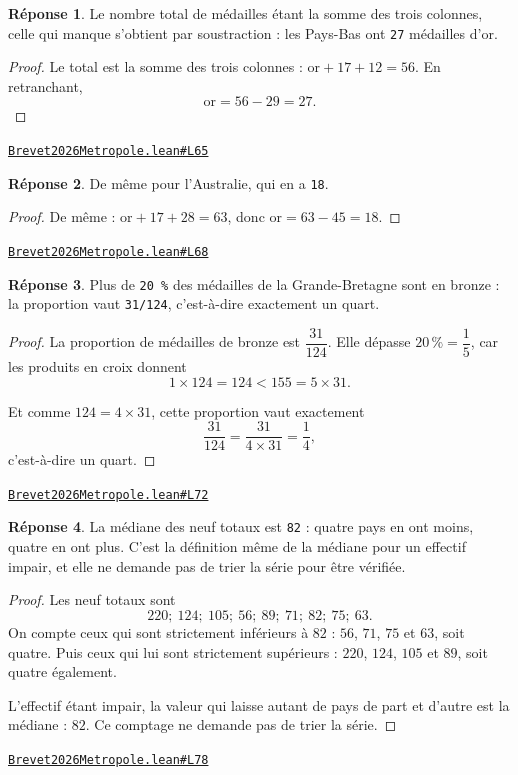 \documentclass[11pt,a4paper]{article}
\theoremstyle{definition}
\theoremstyle{plain}
\theoremstyle{definition}
\newtheorem*{reponse}{Réponse}
\newcommand{\source}[2]{\par\smallskip\noindent\hfill{\footnotesize\href{#1}{\texttt{#2}}}\par\smallskip}
\begin{document}
\begin{reponse}
Le nombre total de médailles étant la somme des trois colonnes, celle qui
manque s'obtient par soustraction : les Pays-Bas ont \texttt{27} médailles d'or.
\end{reponse}
\begin{proof}
Le total est la somme des trois colonnes : $\text{or} + 17 + 12 = 56$. En retranchant,
\[ \text{or} = 56 - 29 = 27 . \]
\end{proof}
\source{https://github.com/Commutator-IO/learn-lean/blob/main/exams/2026/Brevet2026Metropole.lean\#L65}{Brevet2026Metropole.lean\#L65}

\begin{reponse}
De même pour l'Australie, qui en a \texttt{18}.
\end{reponse}
\begin{proof}
De même : $\text{or} + 17 + 28 = 63$, donc $\text{or} = 63 - 45 = 18$.
\end{proof}
\source{https://github.com/Commutator-IO/learn-lean/blob/main/exams/2026/Brevet2026Metropole.lean\#L68}{Brevet2026Metropole.lean\#L68}

\begin{reponse}
Plus de \texttt{20 \%} des médailles de la Grande-Bretagne sont en bronze : la
proportion vaut \texttt{31/124}, c'est-à-dire exactement un quart.
\end{reponse}
\begin{proof}
La proportion de médailles de bronze est $\dfrac{31}{124}$. Elle dépasse $20\,\% =
\dfrac{1}{5}$, car les produits en croix donnent
\[ 1 \times 124 = 124 < 155 = 5 \times 31 . \]

Et comme $124 = 4 \times 31$, cette proportion vaut exactement
\[ \frac{31}{124} = \frac{31}{4 \times 31} = \frac{1}{4} , \]
c'est-à-dire un quart.
\end{proof}
\source{https://github.com/Commutator-IO/learn-lean/blob/main/exams/2026/Brevet2026Metropole.lean\#L72}{Brevet2026Metropole.lean\#L72}

\begin{reponse}
La médiane des neuf totaux est \texttt{82} : quatre pays en ont moins, quatre en ont
plus. C'est la définition même de la médiane pour un effectif impair, et elle ne
demande pas de trier la série pour être vérifiée.
\end{reponse}
\begin{proof}
Les neuf totaux sont
\[ 220 ;\ 124 ;\ 105 ;\ 56 ;\ 89 ;\ 71 ;\ 82 ;\ 75 ;\ 63 . \]
On compte ceux qui sont strictement inférieurs à $82$ : $56$, $71$, $75$ et $63$, soit
quatre. Puis ceux qui lui sont strictement supérieurs : $220$, $124$, $105$ et $89$, soit
quatre également.

L'effectif étant impair, la valeur qui laisse autant de pays de part et d'autre est la
médiane : $82$. Ce comptage ne demande pas de trier la série.
\end{proof}
\source{https://github.com/Commutator-IO/learn-lean/blob/main/exams/2026/Brevet2026Metropole.lean\#L78}{Brevet2026Metropole.lean\#L78}
\end{document}
